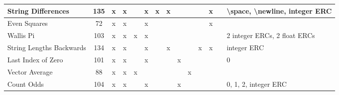 \documentclass{sig-alternate}
\begin{document}
\begin{table*}
\begin{tabular}{|>{\raggedright}p{3.1cm}|c|ccccccccccc|>{\raggedright}p{5.5cm}|}
\hline
String Differences         & 135             & x    & x       &       & x       & x    & x      &                    &                  &                   & x     &            & \textbackslash space, \textbackslash newline, integer ERC                                                                                                                                                                   \tabularnewline
\hline
Even Squares               & 72              & x    & x       &       & x       &      &        &                    &                  &                   & x     &            &                                                                                                                                                                                                                             \tabularnewline
\hline
Wallis Pi                  & 103             & x    & x       & x     & x       &      &        &                    &                  &                   &       &            & 2 integer ERCs, 2 float ERCs                                                                                                                                                                                                \tabularnewline
\hline
String Lengths Backwards   & 134             & x    & x       &       & x       &      & x      &                    &                  & x                 & x     &            & integer ERC                                                                                                                                                                                                                 \tabularnewline
\hline
Last Index of Zero         & 101             & x    & x       &       & x       &      &        & x                  &                  &                   &       &            & 0                                                                                                                                                                                                                           \tabularnewline
\hline
Vector Average             & 88              & x    & x       & x     &         &      &        &                    & x                &                   &       &            &                                                                                                                                                                                                                             \tabularnewline
\hline
Count Odds                 & 104             & x    & x       &       & x       &      &        & x                  &                  &                   &       &            & 0, 1, 2, integer ERC                                                                                                                                                                                                        \tabularnewline

\end{tabular}
\end{table*}
\end{document}
